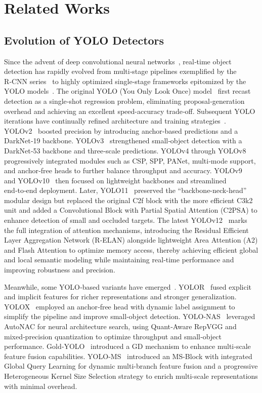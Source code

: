 \section{Related Works}
\subsection{Evolution of YOLO Detectors}
Since the advent of deep convolutional neural networks~\cite{survey_20y}, real‑time object detection has rapidly evolved from multi‑stage pipelines exemplified by the R‑CNN series~\cite{rcnn,fast_rcnn,faster_rcnn, maskrcnn} to highly optimized single‑stage frameworks epitomized by the YOLO models~\cite{yolo_survey}. The original YOLO (You Only Look Once) model~\cite{yolov1} first recast detection as a single‑shot regression problem, eliminating proposal‑generation overhead and achieving an excellent speed-accuracy trade‑off. Subsequent YOLO iterations have continually refined architecture and training strategies~\cite{yolo_based_survey,yolo_survey}. YOLOv2~\cite{yolov2} boosted precision by introducing anchor‑based predictions and a DarkNet‑19 backbone. YOLOv3~\cite{yolov3} strengthened small‑object detection with a DarkNet‑53 backbone and three‑scale predictions. YOLOv4 through YOLOv8~\cite{yolov4,yolov5,yolov6,yolov7,yolov8} progressively integrated modules such as CSP, SPP, PANet, multi‑mode support, and anchor‑free heads to further balance throughput and accuracy. YOLOv9~\cite{yolov9} and YOLOv10~\cite{yolov10} then focused on lightweight backbones and streamlined end‑to‑end deployment. Later, YOLO11~\cite{yolo11} preserved the ``backbone-neck-head'' modular design but replaced the original C2f block with the more efficient C3k2 unit and added a Convolutional Block with Partial Spatial Attention (C2PSA) to enhance detection of small and occluded targets. The latest YOLOv12~\cite{yolov12} marks the full integration of attention mechanisms, introducing the Residual Efficient Layer Aggregation Network (R‑ELAN) alongside lightweight Area Attention (A2) and Flash Attention to optimize memory access, thereby achieving efficient global and local semantic modeling while maintaining real‑time performance and improving robustness and precision.

Meanwhile, some YOLO‑based variants have emerged~\cite{yolo_survey}. YOLOR~\cite{yolor} fused explicit and implicit features for richer representations and stronger generalization. YOLOX~\cite{yolox} employed an anchor‑free head with dynamic label assignment to simplify the pipeline and improve small‑object detection. YOLO‑NAS~\cite{yolonas} leveraged AutoNAC for neural architecture search, using Quant‑Aware RepVGG and mixed‑precision quantization to optimize throughput and small‑object performance. Gold‑YOLO~\cite{goldyolo} introduced a GD mechanism to enhance multi‑scale feature fusion capabilities. YOLO-MS~\cite{yoloms} introduced an MS-Block with integrated Global Query Learning for dynamic multi-branch feature fusion and a progressive Heterogeneous Kernel Size Selection strategy to enrich multi-scale representations with minimal overhead.

